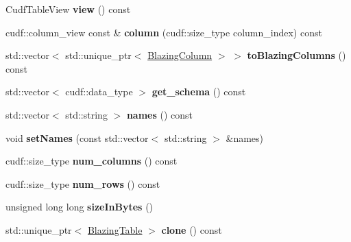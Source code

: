 \begin{DoxyCompactItemize}
Cudf\+Table\+View {\bfseries view} () const
\item 
\mbox{\label{classral_1_1frame_1_1BlazingTableView_a7883b53092571ae6bdbf2994c8099686}} 
cudf\+::column\+\_\+view const  \& {\bfseries column} (cudf\+::size\+\_\+type column\+\_\+index) const
\item 
\mbox{\label{classral_1_1frame_1_1BlazingTableView_a29cd66a4f4da704e455bf34b21a1c64a}} 
std\+::vector$<$ std\+::unique\+\_\+ptr$<$ \hyperlink{classral_1_1frame_1_1BlazingColumn}{Blazing\+Column} $>$ $>$ {\bfseries to\+Blazing\+Columns} () const
\item 
\mbox{\label{classral_1_1frame_1_1BlazingTableView_afcebfe01ec7db42b859bf6598f65a3f5}} 
std\+::vector$<$ cudf\+::data\+\_\+type $>$ {\bfseries get\+\_\+schema} () const
\item 
\mbox{\label{classral_1_1frame_1_1BlazingTableView_a6b6d93945df55aed6cc1039bcb3743b3}} 
std\+::vector$<$ std\+::string $>$ {\bfseries names} () const
\item 
\mbox{\label{classral_1_1frame_1_1BlazingTableView_aff8c4df40002de33aa4b176daaa8e1c0}} 
void {\bfseries set\+Names} (const std\+::vector$<$ std\+::string $>$ \&names)
\item 
\mbox{\label{classral_1_1frame_1_1BlazingTableView_ae239be70b79bcafb195d6e8850655162}} 
cudf\+::size\+\_\+type {\bfseries num\+\_\+columns} () const
\item 
\mbox{\label{classral_1_1frame_1_1BlazingTableView_a39ab4d3e5b6df35263e890032ca943e7}} 
cudf\+::size\+\_\+type {\bfseries num\+\_\+rows} () const
\item 
\mbox{\label{classral_1_1frame_1_1BlazingTableView_adf6a6ea945a422b25beb46ec7c21d863}} 
unsigned long long {\bfseries size\+In\+Bytes} ()
\item 
\mbox{\label{classral_1_1frame_1_1BlazingTableView_a0243487937ce1de435ad96562f12f814}} 
std\+::unique\+\_\+ptr$<$ \hyperlink{classral_1_1frame_1_1BlazingTable}{Blazing\+Table} $>$ {\bfseries clone} () const
\end{DoxyCompactItemize}


